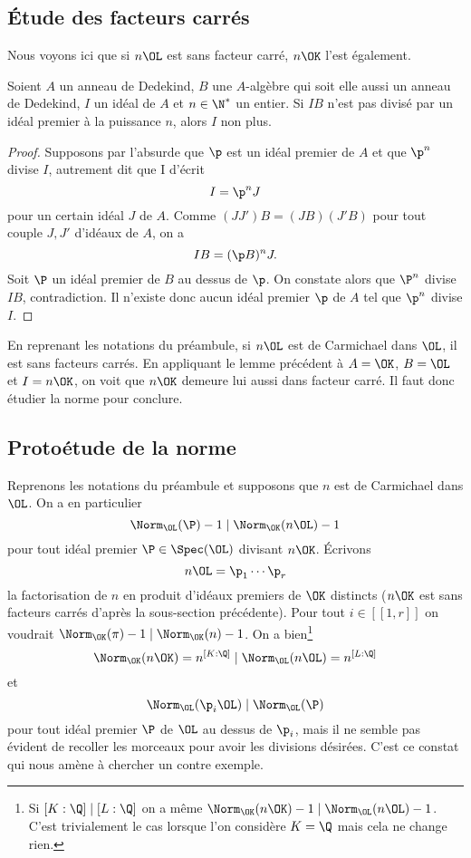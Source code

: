 \documentclass[a4paper, 12pt, oneside]{article}
\begin{document}
\subsection{Étude des facteurs carrés}

Nous voyons ici que si $n\OL$ est sans facteur carré, $n\OK$ l'est également.

\begin{lemme}Soient $A$ un anneau de Dedekind, $B$ une $A$-algèbre qui soit elle aussi un anneau de Dedekind, $I$ un idéal de $A$ et $n\in \N^*$ un entier. Si $IB$ n'est pas divisé par un idéal premier à la puissance $n$, alors $I$ non plus.
\end{lemme}

\begin{proof}
	Supposons par l'absurde que $\p$ est un idéal premier de $A$ et que $\p^n$ divise $I$, autrement dit que I d'écrit $$I = \p^n J$$ pour un certain idéal $J$ de $A$. Comme $(JJ')B = (JB)(J'B)$ pour tout couple $J, J'$ d'idéaux de $A$, on a $$IB = (\p B)^n J.$$ Soit $\P$ un idéal premier de $B$ au dessus de $\p$. On constate alors que $\P^n$ divise $IB$, contradiction. Il n'existe donc aucun idéal premier $\p$ de $A$ tel que $\p^n$ divise $I$.
\end{proof}

En reprenant les notations du préambule, si $n\OL$ est de Carmichael dans $\OL$, il est sans facteurs carrés. En appliquant le lemme précédent à $A=\OK$, $B=\OL$ et $I = n\OK$, on voit que $n\OK$ demeure lui aussi dans facteur carré. Il faut donc étudier la norme pour conclure.

\subsection{Protoétude de la norme}

Reprenons les notations du préambule et supposons que $n$ est de Carmichael dans $\OL$. On a en particulier $$\Norm_\OL(\P) - 1 \mid \Norm_\OK(n\OL) - 1$$ pour tout idéal premier $\P\in \Spec(\OL)$ divisant $n\OK$. Écrivons $$n\OL = \p_1\cdots \p_r$$ la factorisation de $n$ en produit d'idéaux premiers de $\OK$ distincts ($n\OK$ est sans facteurs carrés d'après la sous-section précédente). Pour tout $i\in [\![1, r]\!]$ on voudrait $\Norm_\OK(\pi) - 1\mid \Norm_\OK(n) - 1$. On a bien\footnote{Si $[K : \Q]\mid [L:\Q]$ on a même $\Norm_\OK(n\OK) - 1\mid \Norm_\OL(n\OL) - 1$. C'est trivialement le cas lorsque l'on considère $K=\Q$ mais cela ne change rien.} $$\Norm_\OK(n\OK) = n^{[K : \Q]} \mid \Norm_\OL(n\OL) = n^{[L : \Q]}$$ et $$\Norm_\OL(\p_i \OL) \mid \Norm_\OL(\P)$$ pour tout idéal premier $\P$ de $\OL$ au dessus de $\p_i$, mais il ne semble pas évident de recoller les morceaux pour avoir les divisions désirées. C'est ce constat qui nous amène à chercher un contre exemple.
\end{document}
